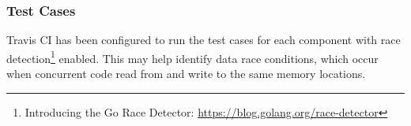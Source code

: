 
\subsubsection{Test Cases}

Travis CI has been configured to run the test cases for each component with race detection\footnote{Introducing the Go Race Detector: \url{https://blog.golang.org/race-detector}} enabled. This may help identify data race conditions, which occur when concurrent code read from and write to the same memory locations.
